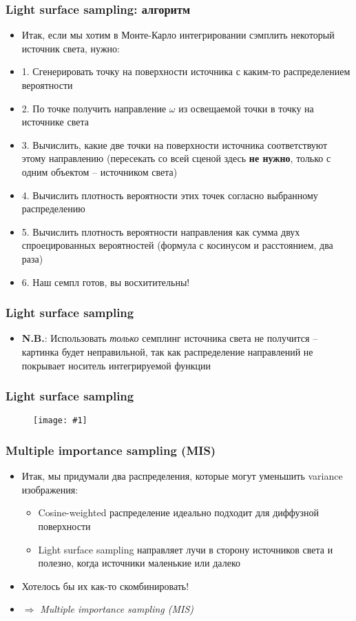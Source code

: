\documentclass[handout,10pt]{beamer}
\newcommand{\slideimage}[1]{
  \begin{figure}
    \begin{adjustbox}{width=\textwidth, totalheight=\textheight-2\baselineskip-2\baselineskip,keepaspectratio}
      \texttt{[image: \#1]}
    \end{adjustbox}
  \end{figure}
}
\begin{document}
\begin{frame}
\frametitle{Light surface sampling: алгоритм}
\begin{itemize}
\item Итак, если мы хотим в Монте-Карло интегрировании сэмплить некоторый источник света, нужно:
\pause
\item 1. Сгенерировать точку на поверхности источника с каким-то распределением вероятности
\pause
\item 2. По точке получить направление \begin{math}\omega\end{math} из освещаемой точки в точку на источнике света
\pause
\item 3. Вычислить, какие две точки на поверхности источника соответствуют этому направлению (пересекать со всей сценой здесь \textbf{не нужно}, только с одним объектом -- источником света)
\pause
\item 4. Вычислить плотность вероятности этих точек согласно выбранному распределению
\pause
\item 5. Вычислить плотность вероятности направления как сумма двух спроецированных вероятностей (формула с косинусом и расстоянием, два раза)
\pause
\item 6. Наш семпл готов, вы восхитительны!
\end{itemize}
\end{frame}

\begin{frame}
\frametitle{Light surface sampling}
\begin{itemize}
\item \textbf{\alert{N.B.}}: Использовать \textit{только} семплинг источника света не получится -- картинка будет неправильной, так как распределение направлений не покрывает носитель интегрируемой функции
\end{itemize}
\end{frame}

\begin{frame}
\frametitle{Light surface sampling}
\slideimage{only_light_1024.png}
\end{frame}

\begin{frame}
\frametitle{Multiple importance sampling (MIS)}
\begin{itemize}
\item Итак, мы придумали два распределения, которые могут уменьшить variance изображения:
\pause
\begin{itemize}
\item Cosine-weighted распределение идеально подходит для диффузной поверхности
\pause
\item Light surface sampling направляет лучи в сторону источников света и полезно, когда источники маленькие или далеко
\end{itemize}
\pause
\item Хотелось бы их как-то скомбинировать!
\pause
\item \begin{math}\Longrightarrow\end{math} \textit{Multiple importance sampling (MIS)}
\end{itemize}
\end{frame}
\end{document}
